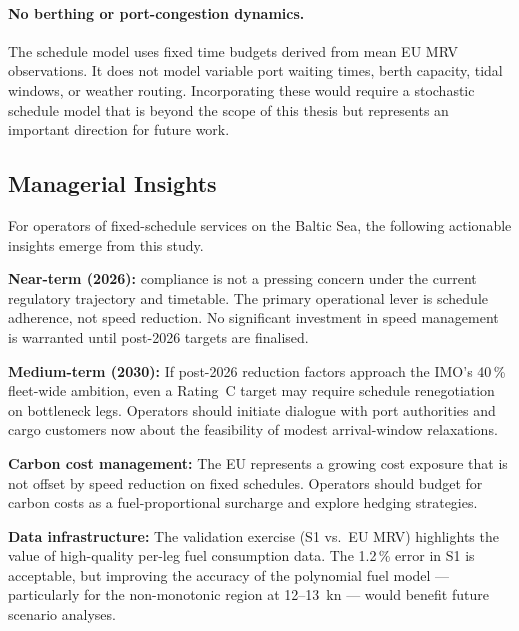 \paragraph{No berthing or port-congestion dynamics.}
The schedule model uses fixed time budgets derived from mean EU MRV
observations.  It does not model variable port waiting times, berth
capacity, tidal windows, or weather routing.  Incorporating these
would require a stochastic schedule model that is beyond the scope
of this thesis but represents an important direction for future work.

\subsection{Managerial Insights}
\label{sec:disc:managerial}

For operators of fixed-schedule \RoRo{} services on the Baltic Sea, the
following actionable insights emerge from this study.

\textbf{Near-term (2026):} \CII{} compliance is not a pressing concern
under the current regulatory trajectory and timetable.  The primary
operational lever is schedule adherence, not speed reduction.  No
significant investment in speed management is warranted until post-2026
targets are finalised.

\textbf{Medium-term (2030):} If post-2026 reduction factors approach
the IMO's 40\,\% fleet-wide ambition, even a Rating~C target may require
schedule renegotiation on bottleneck legs.  Operators should initiate
dialogue with port authorities and cargo customers now about the
feasibility of modest arrival-window relaxations.

\textbf{Carbon cost management:} The EU \ETS{} represents a growing
cost exposure that is not offset by speed reduction on fixed schedules.
Operators should budget for carbon costs as a fuel-proportional surcharge
and explore hedging strategies.

\textbf{Data infrastructure:} The validation exercise (S1 vs.\ EU MRV)
highlights the value of high-quality per-leg fuel consumption data.
The 1.2\,\% \CII{} error in S1 is acceptable, but improving the accuracy
of the polynomial fuel model --- particularly for the non-monotonic
region at 12--13~kn --- would benefit future scenario analyses.
